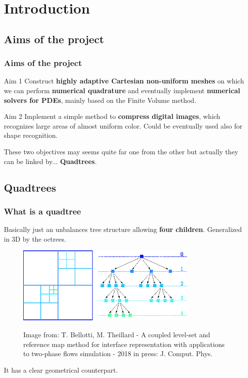 \documentclass[8pt]{beamer}
\begin{document}
\section{Introduction}
\subsection{Aims of the project}
\begin{frame}
\frametitle{Aims of the project}
\pause
\begin{block}{Aim 1}
 Construct \textbf{highly adaptive Cartesian non-uniform meshes} on which we can perform \textbf{numerical quadrature} and eventually implement \textbf{numerical solvers for PDEs}, mainly based on the Finite Volume method.
\end{block}
\pause
\begin{block}{Aim 2}
Implement a simple method to \textbf{compress digital images}, which recognizes large areas of almost uniform color. Could be eventually used also for shape recognition. 
\end{block}
\pause

These two objectives may seems quite far one from the other but actually they can be linked by... \textbf{Quadtrees}.

\end{frame}
\begin{frame}

\section{Quadtrees}
\frametitle{What is a quadtree}
\pause
Basically just an unbalances tree structure allowing \textbf{four children}. Generalized in 3D by the octrees.
\pause
\begin{figure}[!h]
\begin{center}
\includegraphics[width=0.8\textwidth]{./figures/quadtree.eps}

\begin{tiny}
Image from: T. Bellotti, M. Theillard - A coupled level-set and reference map method for interface representation with applications to two-phase flows simulation - 2018 in press: J. Comput. Phys.
\end{tiny}
\end{center}
\end{figure}
 \pause
 It has a clear geometrical counterpart.
\end{frame}
\end{document}
